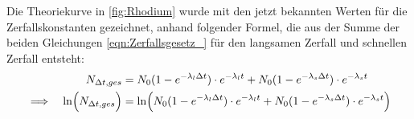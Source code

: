         Die Theoriekurve in \autoref{fig:Rhodium} wurde mit den jetzt bekannten Werten für die Zerfallskonstanten gezeichnet, anhand folgender Formel, die aus der Summe der beiden Gleichungen \ref{eqn:Zerfallsgesetz_} für den langsamen Zerfall und schnellen Zerfall entsteht:
        \begin{align*}
            &&N_{\Delta t, ges} &= N_0 (1 - e^{-\lambda_l \Delta t}) \cdot e^{-\lambda_l t} + N_0 (1 - e^{-\lambda_s \Delta t}) \cdot e^{-\lambda_s t} \\
            \implies &&\ln\Bigl(N_{\Delta t, ges} \Bigr) &= \ln\Bigl(N_0 (1 - e^{-\lambda_l \Delta t}) \cdot e^{-\lambda_l t} + N_0 (1 - e^{-\lambda_s \Delta t}) \cdot e^{-\lambda_s t} \Bigr)
        \end{align*}

